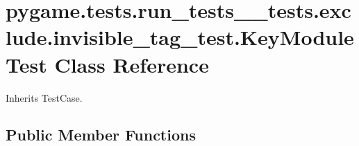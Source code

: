 \hypertarget{classpygame_1_1tests_1_1run__tests____tests_1_1exclude_1_1invisible__tag__test_1_1_key_module_test}{}\section{pygame.\+tests.\+run\+\_\+tests\+\_\+\+\_\+tests.\+exclude.\+invisible\+\_\+tag\+\_\+test.\+Key\+Module\+Test Class Reference}
\label{classpygame_1_1tests_1_1run__tests____tests_1_1exclude_1_1invisible__tag__test_1_1_key_module_test}


Inherits Test\+Case.

\subsection*{Public Member Functions}
